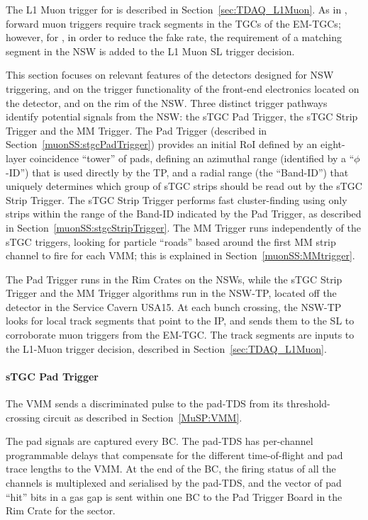 \documentclass[cernpreprint, atlasdraft=false, UKenglish,british,orcidlogo, texmf, orcidlogo]{atlasdoc}
\begin{document}
The \gls{L1} Muon trigger for \RunThr is described in Section~{\ref{sec:TDAQ_L1Muon}}. As in \RunOneTwo, forward muon triggers require track segments in the \glspl{TGC} of the \glspl{EM-TGC}; however, for \RunThr, in order to reduce the fake rate, the requirement of a matching segment in the \gls{NSW} is added to the \gls{L1} Muon \gls{SL} trigger decision.
 
This section focuses on relevant features of the detectors designed for \gls{NSW} triggering, and on the trigger functionality of the front-end electronics located on the detector, and on the rim of the \gls{NSW}.
Three distinct trigger pathways identify potential signals from the \gls{NSW}: the \gls{sTGC} Pad Trigger, the \gls{sTGC} Strip Trigger and the \gls{MM} Trigger.
The Pad Trigger (described in Section~\ref{muonSS:stgcPadTrigger}) provides an initial \gls{RoI} defined by an eight-layer coincidence ``tower'' of pads, defining an azimuthal range (identified by a ``$\phi$-ID'') that is used directly by the \gls{TP}, and a radial range (the ``Band-ID'') that uniquely determines which group of \gls{sTGC} strips should be read out by the \gls{sTGC} Strip Trigger.
The \gls{sTGC} Strip Trigger performs fast cluster-finding using only strips within the range of the Band-ID indicated by the Pad Trigger, as described in Section~\ref{muonSS:stgcStripTrigger}. The \gls{MM} Trigger runs independently of the \gls{sTGC} triggers, looking for particle ``roads'' based around the first \gls{MM} strip channel to fire for each \gls{VMM}; this is explained in Section~\ref{muonSS:MMtrigger}.
 
The Pad Trigger runs in the Rim Crates on the \glspl{NSW}, while the \gls{sTGC} Strip Trigger and the \gls{MM} Trigger algorithms run in the \gls{NSW-TP}, located off the detector in the Service Cavern \gls{USA15}.
At each bunch crossing, the \gls{NSW-TP} looks for local track segments that point to the \gls{IP}, and sends them to the \gls{SL} 
to corroborate muon triggers from the \gls{EM-TGC}.
The track segments are inputs to the \gls{L1}-Muon trigger decision, described in Section~\ref{sec:TDAQ_L1Muon}.
 
\paragraph{sTGC Pad Trigger \label{muonSS:stgcPadTrigger}}
The \gls{VMM} sends a discriminated 
pulse to the pad-\gls{TDS} from its 
threshold-crossing circuit
as described in Section~\ref{MuSP:VMM}.
 
The pad signals  are captured every \gls{BC}. The pad-\gls{TDS} has per-channel programmable delays that compensate for the different time-of-flight and pad trace lengths to the \gls{VMM}. At the end of the \gls{BC}, the firing status of all the channels is multiplexed and serialised by the pad-\gls{TDS}, and the vector of pad ``hit'' bits in a gas gap is sent within one \gls{BC} to the Pad Trigger Board in the Rim Crate for the sector.
 
\end{document}
